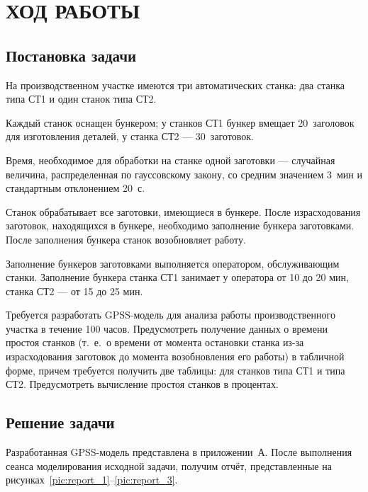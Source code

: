 \section{ХОД РАБОТЫ}

\subsection{Постановка задачи}

На производственном участке имеются три автоматических станка:
два станка типа СТ1 и один станок типа СТ2.

Каждый станок оснащен бункером; у станков СТ1 бункер вмещает
20 заголовок для изготовления деталей, у станка СТ2 --- 30 заготовок.

Время, необходимое для обработки на станке одной заготовки --- случайная величина,
распределенная по гауссовскому закону, со средним значением 3 мин
и стандартным отклонением 20 с.

Станок обрабатывает все заготовки, имеющиеся в бункере.
После израсходования заготовок, находящихся в бункере,
необходимо заполнение бункера заготовками. После заполнения бункера станок возобновляет работу.

Заполнение бункеров заготовками выполняется оператором, обслуживающим станки.
Заполнение бункера станка СТ1 занимает у оператора от 10 до 20 мин,
станка СТ2 --- от 15 до 25 мин.

Требуется разработать GPSS-модель для анализа работы производственного участка
в течение 100 часов. Предусмотреть получение данных о времени простоя станков
(т.~е.~о времени от момента остановки станка из-за израсходования заготовок
до момента возобновления его работы) в табличной форме, причем требуется
получить две таблицы: для станков типа СТ1 и типа СТ2.
Предусмотреть вычисление простоя станков в процентах.


\subsection{Решение задачи}

Разработанная GPSS-модель представлена в приложении~А. После выполнения сеанса
моделирования исходной задачи, получим отчёт, представленные на
рисунках~\ref{pic:report_1}--\ref{pic:report_3}.

\newpage

